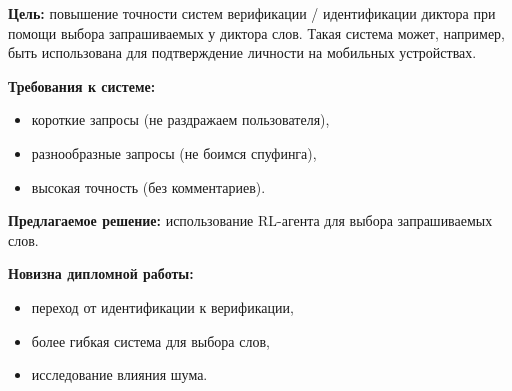 \textbf{Цель:} повышение точности систем верификации / идентификации диктора
при помощи выбора запрашиваемых у диктора слов. Такая система может, например,
быть использована для подтверждение личности на мобильных
устройствах.\vspace{1em}

\textbf{Требования к системе:}
\begin{itemize}
    \item короткие запросы (не раздражаем пользователя),
    \item разнообразные запросы (не боимся спуфинга),
    \item высокая точность (без комментариев).
\end{itemize}\vspace{1em}

\textbf{Предлагаемое решение:} использование RL-агента для выбора
запрашиваемых слов.\vspace{1em}

\textbf{Новизна дипломной работы:}
\begin{itemize}
    \item переход от идентификации к верификации,
    \item более гибкая система для выбора слов,
    \item исследование влияния шума.
\end{itemize}